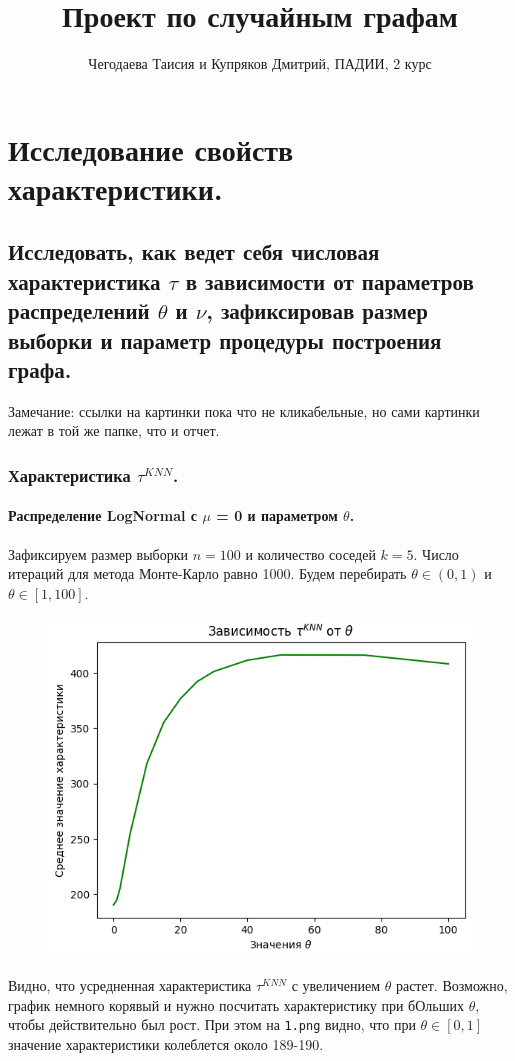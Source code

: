 \documentclass{report}
\title{Проект по случайным графам}
\author{Чегодаева Таисия и Купряков Дмитрий, ПАДИИ, 2 курс}
\begin{document}
\maketitle

\part{Исследование свойств характеристики.}
\chapter{Исследовать, как ведет себя числовая характеристика $\tau$ в зависимости от параметров распределений $\theta$ и $\nu$, зафиксировав размер выборки и параметр процедуры построения графа.}
Замечание: ссылки на картинки пока что не кликабельные, но сами картинки лежат в той же папке, что и отчет.
\section{Характеристика $\tau^{KNN}$.}
\subsection{Распределение LogNormal с $\mu$ = 0 и параметром $\theta$.}
Зафиксируем размер выборки $n = 100$ и количество соседей $k = 5$. Число итераций для метода Монте-Карло равно 1000.
\newline
\newline
Будем перебирать $\theta \in (0, 1)$ и $\theta \in [1, 100]$.
\newline
\newline
\begin{figure}[h]
    \centering
    \includegraphics[width=0.5\linewidth]{2.png}
\end{figure}
\newline
\newline
Видно, что усредненная характеристика $\tau^{KNN}$ с увеличением $\theta$ растет. Возможно, график немного корявый и нужно посчитать характеристику при бОльших $\theta$, чтобы действительно был рост.
\newline
\newline
При этом на \texttt{1.png} видно, что при $\theta \in [0, 1]$ значение характеристики колеблется около 189-190.
\end{document}

